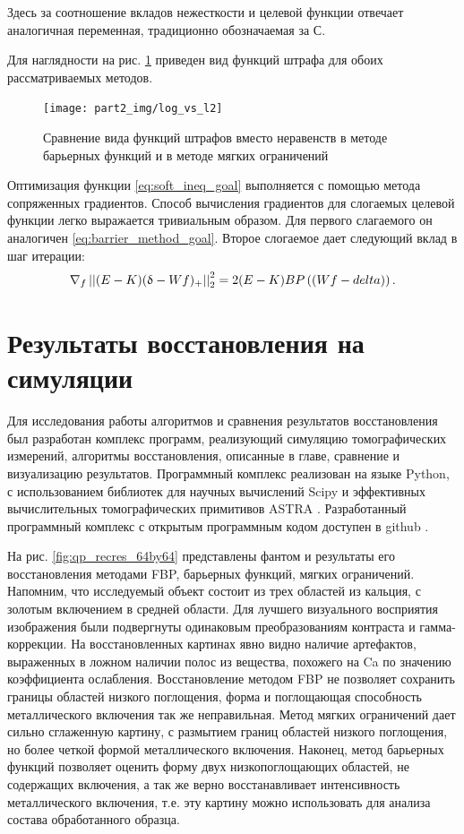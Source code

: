 Здесь за соотношение вкладов нежесткости и целевой функции отвечает аналогичная переменная, традиционно обозначаемая за $С$.

Для наглядности на рис. \ref{fig:log_vs_l2} приведен вид функций штрафа для обоих рассматриваемых методов.

\begin{figure}
    \centering
    \texttt{[image: part2\_img/log\_vs\_l2]} \\
    \caption{Сравнение вида функций штрафов вместо неравенств в методе барьерных функций и в методе мягких ограничений}
    \label{fig:log_vs_l2}
\end{figure}

Оптимизация функции \eqref{eq:soft_ineq_goal} выполняется с помощью метода сопряженных градиентов.
Способ вычисления градиентов для слогаемых целевой функции легко выражается тривиальным образом.
Для первого слагаемого он аналогичен \eqref{eq:barrier_method_goal}.
Второе слогаемое дает следующий вклад в шаг итерации:
$$
\nabla_f \left|\left| (E-K)(\updelta - Wf)_+ \right|\right|_2^2 = 2 (E-K) BP\left((Wf - delta)\right).
$$


\section{Результаты восстановления на симуляции}
Для исследования работы алгоритмов и сравнения результатов восстановления был разработан комплекс программ, реализующий симуляцию томографических измерений, алгоритмы восстановления, описанные в главе, сравнение и визуализацию результатов.
Программный комплекс реализован на языке Python, с использованием библиотек для научных вычислений Scipy \cite{scipy} и эффективных вычислительных томографических примитивов ASTRA \cite{van2015astra}.
Разработанный программный комплекс с открытым программным кодом доступен в github \cite{whitomo}.

На рис. \ref{fig:qp_recres_64by64} представлены фантом и  результаты его восстановления методами FBP, барьерных функций, мягких ограничений. 
Напомним, что исследуемый объект состоит из трех областей из кальция, с золотым включением в средней области.
Для лучшего визуального восприятия изображения были подвергнуты одинаковым преобразованиям контраста и гамма-коррекции.
На восстановленных картинах явно видно наличие артефактов, выраженных в ложном наличии полос из вещества, похожего на Ca по значению коэффициента ослабления.
Восстановление методом FBP не позволяет сохранить границы областей низкого поглощения, форма и поглощающая способность металлического включения так же неправильная.
Метод мягких ограничений дает сильно сглаженную картину, с размытием границ областей низкого поглощения, но более четкой формой металлического включения.
Наконец, метод барьерных функций позволяет оценить форму двух низкопоглощающих областей, не содержащих включения, а так же верно восстанавливает интенсивность металлического включения, т.е. эту картину можно использовать для анализа состава обработанного образца.

